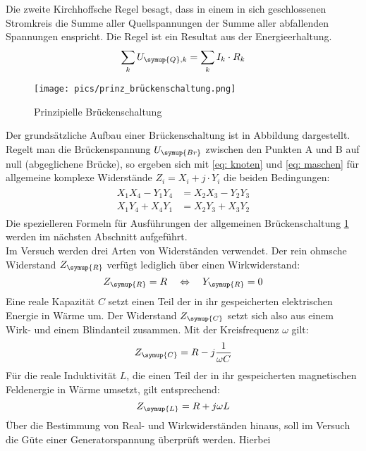 Die zweite Kirchhoffsche Regel besagt, dass in einem in sich geschlossenen Stromkreis
die Summe aller Quellspannungen der Summe aller abfallenden
Spannungen enspricht. Die Regel ist ein Resultat aus der Energieerhaltung.
\begin{equation}
  \sum_k U_{\symup{Q},k} = \sum_k I_k \cdot R_k
  \label{eq: maschen}
\end{equation}
\begin{figure}
  \centering
  \texttt{[image: pics/prinz\_brückenschaltung.png]}
  \caption{Prinzipielle Brückenschaltung\cite{anleitung302}}
  \label{fig: prinzbrücke}
\end{figure}
Der grundsätzliche Aufbau einer Brückenschaltung ist in Abbildung  dargestellt. Regelt man die Brückenspannung $U_{\symup{Br}}$
zwischen den Punkten A und B auf null (abgeglichene Brücke), so ergeben sich mit \eqref{eq: knoten} und \eqref{eq: maschen}
für allgemeine komplexe Widerstände ${Z}_i = X_i + j \cdot Y_i$ die
beiden Bedingungen:
\begin{align}
  \begin{aligned}
    X_1 X_4 - Y_1 Y_4 &= X_2 X_3 - Y_2 Y_3 \\
    X_1 Y_4 + X_4 Y_1 &= X_2 Y_3 + X_3 Y_2
  \end{aligned}
  \label{eq: widerstandsbedingungen}
\end{align}
Die spezielleren Formeln für Ausführungen der allgemeinen Brückenschaltung \ref{fig: prinzbrücke} werden im nächsten Abschnitt aufgeführt.\\
Im Versuch werden drei Arten von Widerständen verwendet. Der rein ohmsche Widerstand
$Z_{\symup{R}}$ verfügt lediglich über einen Wirkwiderstand:
\begin{equation}
 Z_{\symup{R}} = R \quad \Leftrightarrow \quad Y_{\symup{R}} = 0
\end{equation}
Eine reale Kapazität $C$ setzt einen Teil der in ihr gespeicherten elektrischen Energie
in Wärme um. Der Widerstand $Z_{\symup{C}}$ setzt sich also aus einem Wirk- und einem Blindanteil zusammen. Mit der Kreisfrequenz $\omega$ gilt:
\begin{equation}
  Z_{\symup{C}} = R - j \frac{1}{\omega C}
\end{equation}
Für die reale Induktivität $L$, die einen Teil der in ihr
gespeicherten magnetischen Feldenergie in Wärme umsetzt, gilt entsprechend:
\begin{equation}
  Z_{\symup{L}} = R + j \omega L
\end{equation}
Über die Bestimmung von Real- und Wirkwiderständen hinaus, soll im Versuch die Güte einer Generatorspannung überprüft werden. Hierbei
